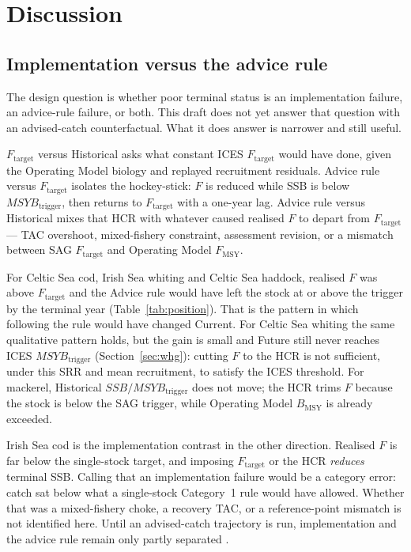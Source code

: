 \documentclass[11pt,a4paper]{article}
\newcommand{\Fmsy}{F_{\mathrm{MSY}}}
\newcommand{\Btrig}{MSYB_{\mathrm{trigger}}}
\newcommand{\Bmsy}{B_{\mathrm{MSY}}}
\newcommand{\Ftar}{F_{\mathrm{target}}}
\begin{document}
\section{Discussion}
\label{sec:discussion}

\subsection{Implementation versus the advice rule}

The design question is whether poor terminal status is an implementation
failure, an advice-rule failure, or both. This draft does not yet answer
that question with an advised-catch counterfactual. What it does answer
is narrower and still useful.

$F_{\mathrm{target}}$ versus Historical asks what constant ICES $\Ftar$ would have
done, given the Operating Model biology and replayed recruitment
residuals. Advice rule versus $F_{\mathrm{target}}$ isolates the hockey-stick: $F$ is
reduced while SSB is below $\Btrig$, then returns to $\Ftar$ with a
one-year lag. Advice rule versus Historical mixes that HCR with whatever
caused realised $F$ to depart from $\Ftar$ --- TAC overshoot, mixed-fishery
constraint, assessment revision, or a mismatch between SAG $\Ftar$ and
Operating Model $\Fmsy$.

For Celtic Sea cod, Irish Sea whiting and Celtic Sea haddock, realised
$F$ was above $\Ftar$ and the Advice rule would have left the stock at
or above the trigger by the terminal year (Table~\ref{tab:position}).
That is the pattern in which following the rule would have changed
Current. For Celtic Sea whiting the same qualitative pattern holds, but
the gain is small and Future still never reaches ICES $\Btrig$
(Section~\ref{sec:whg}): cutting $F$ to the HCR is not sufficient, under
this SRR and mean recruitment, to satisfy the ICES threshold. For
mackerel, Historical $SSB/\Btrig$ does not move; the HCR trims $F$ because the
stock is below the SAG trigger, while Operating Model $\Bmsy$ is already
exceeded.

Irish Sea cod is the implementation contrast in the other direction.
Realised $F$ is far below the single-stock target, and imposing $\Ftar$
or the HCR \emph{reduces} terminal SSB. Calling that an implementation
failure would be a category error: catch sat below what a single-stock
Category~1 rule would have allowed. Whether that was a mixed-fishery
choke, a recovery TAC, or a reference-point mismatch is not identified
here. Until an advised-catch trajectory is run, implementation and the
advice rule remain only partly separated
\citep{punt2016msebestpractice,winker2026rebuilding}.
\end{document}
